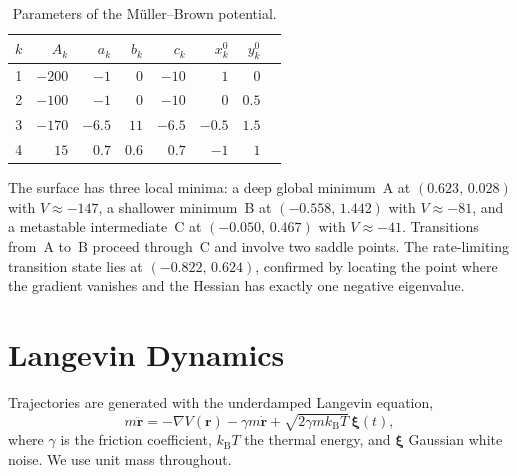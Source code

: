 \documentclass[11pt,a4paper]{article}
\begin{document}
\begin{table}[h]
\centering
\caption{Parameters of the M\"{u}ller--Brown potential.}
\label{tab:params}
\begin{tabular}{rrrrrrrr}
\toprule
$k$ & $A_k$ & $a_k$ & $b_k$ & $c_k$ & $x_k^0$ & $y_k^0$ \\
\midrule
1 & $-200$ & $-1$   & $0$  & $-10$  & $1$    & $0$   \\
2 & $-100$ & $-1$   & $0$  & $-10$  & $0$    & $0.5$ \\
3 & $-170$ & $-6.5$ & $11$ & $-6.5$ & $-0.5$ & $1.5$ \\
4 & $15$   & $0.7$  & $0.6$& $0.7$  & $-1$   & $1$   \\
\bottomrule
\end{tabular}
\end{table}

The surface has three local minima: a deep global minimum~A at
$(0.623,\, 0.028)$ with $V \approx -147$, a shallower minimum~B at
$(-0.558,\, 1.442)$ with $V \approx -81$, and a metastable intermediate~C at
$(-0.050,\, 0.467)$ with $V \approx -41$.  Transitions from~A to~B proceed
through~C and involve two saddle points.  The rate-limiting transition state
lies at $(-0.822,\, 0.624)$, confirmed by locating the point where the gradient
vanishes and the Hessian has exactly one negative eigenvalue.

\section{Langevin Dynamics}

Trajectories are generated with the underdamped Langevin equation,
\begin{equation}
    m\ddot{\mathbf{r}} = -\nabla V(\mathbf{r})
                         - \gamma m \dot{\mathbf{r}}
                         + \sqrt{2\gamma m k_\mathrm{B}T}\,\boldsymbol{\xi}(t),
\end{equation}
where $\gamma$ is the friction coefficient, $k_\mathrm{B}T$ the thermal energy,
and $\boldsymbol{\xi}$ Gaussian white noise.  We use unit mass throughout.
\end{document}
